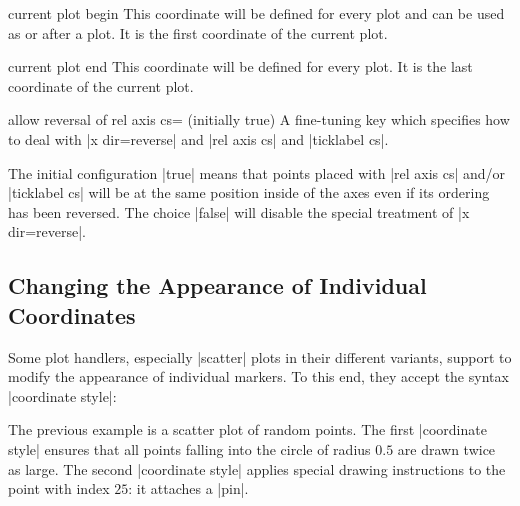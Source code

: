 \begin{predefinednode}{current plot begin}
    This coordinate will be defined for every plot and can be used as
     or after a plot. It is the first coordinate
    of the current plot.
\end{predefinednode}

\begin{predefinednode}{current plot end}
    This coordinate will be defined for every plot. It is the last coordinate
    of the current plot.
\end{predefinednode}

\begin{pgfplotskey}{allow reversal of rel axis cs= (initially true)}
    A fine-tuning key which specifies how to deal with |x dir=reverse| and
    |rel axis cs| and |ticklabel cs|.

    The initial configuration |true| means that points placed with
    |rel axis cs| and/or |ticklabel cs| will be at the same position inside of
    the axes even if its ordering has been reversed. The choice |false| will
    disable the special treatment of |x dir=reverse|.
\end{pgfplotskey}


\subsection{Changing the Appearance of Individual Coordinates}
\label{sec:coordinate:style}

Some plot handlers, especially |scatter| plots in their different variants,
support to modify the appearance of individual markers. To this end, they
accept the syntax |coordinate style|:
%
\begin{codeexample}[]
\end{codeexample}
%
The previous example is a scatter plot of random points. The first
|coordinate style| ensures that all points falling into the circle of radius
$0.5$ are drawn twice as large. The second |coordinate style| applies special
drawing instructions to the point with index $25$: it attaches a |pin|.

